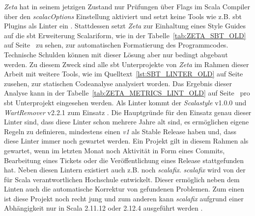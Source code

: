 \textit{Zeta} hat in seinem jetzigen Zustand nur Prüfungen über Flags im Scala Compiler über den \textit{scalacOptions} Einstellung aktiviert und setzt keine Tools wie z.B. \ac{sbt} Plugins als Linter ein \cite{zeta_api_built}. Stattdessen setzt \textit{Zeta} zur Einhaltung eines Style Guides auf die \ac{sbt} Erweiterung Scalariform, wie in der Tabelle~\ref{tab:ZETA_SBT_OLD} auf Seite~\pageref{tab:ZETA_SBT_OLD} zu sehen, zur automatischen Formatierung des Programmcodes. Technische Schulden können mit dieser Lösung aber nur bedingt abgebaut werden. Zu diesem Zweck sind alle \ac{sbt} Unterprojekte von \textit{Zeta} im Rahmen dieser Arbeit mit weitere Tools, wie im Quelltext~\ref{lst:SBT_LINTER_OLD} auf Seite~\pageref{lst:SBT_LINTER_OLD} zusehen, zur statischen Codeanalyse analysiert worden. Das Ergebnis dieser Analyse kann in der Tabelle~\ref{tab:ZETA_METRICS_LINT_OLD} auf Seite~\pageref{tab:ZETA_METRICS_LINT_OLD} pro \ac{sbt} Unterprojekt eingesehen werden. Als Linter kommt der \textit{Scalastyle} v1.0.0 und \textit{WartRemover} v2.2.1 zum Einsatz \cite{scalastyle,wartremover}. Die Hauptgründe für den Einsatz genau dieser Linter sind, dass diese Linter schon mehrere Jahre alt sind, es ermöglichen eigene Regeln zu definieren, mindestens einen \textit{v1} als Stable Release haben und, dass diese Linter immer noch gewartet werden. Ein Projekt gilt in diesem Rahmen als gewartet, wenn im letzten Monat noch Aktivität in Form eines Commits, Bearbeitung eines Tickets oder die Veröffentlichung eines Release stattgefunden hat. Neben diesen Lintern existiert auch z.B. noch \textit{scalafix}. \textit{scalafix} wird von der für Scala verantwortlichen Hochschule entwickelt. Dieser ermöglich neben dem Linten auch die automatische Korrektur von gefundenen Problemen. Zum einen ist diese Projekt noch recht jung und zum anderen kann \textit{scalafix} aufgrund einer Abhängigkeit nur in Scala 2.11.12 oder 2.12.4 ausgeführt werden \cite{scalafix_sbt1}.

